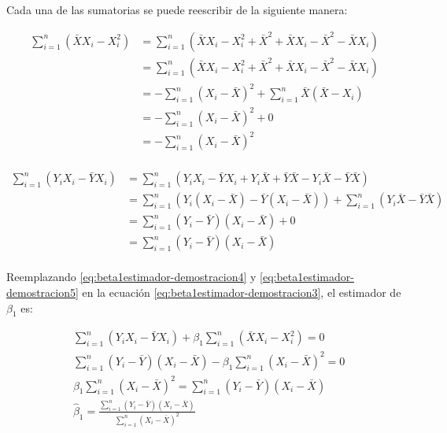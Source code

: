 \documentclass[
  11pt,
]{book}
\theoremstyle{definition}
\theoremstyle{definition}
\theoremstyle{definition}
\theoremstyle{definition}
\theoremstyle{remark}
\begin{document}
Cada una de las sumatorias se puede reescribir de la siguiente manera:

\begin{equation}
\begin{split}
\sum_{i=1}^n(\bar{X}X_i - X_i^2) &= \sum_{i=1}^n(\bar{X}X_i - X_i^2 + \bar{X}^2 + \bar{X}X_i - \bar{X}^2 - \bar{X}X_i)\\
&= \sum_{i=1}^n(\bar{X}X_i - X_i^2 + \bar{X}^2 + \bar{X}X_i - \bar{X}^2 - \bar{X}X_i)\\
&= -\sum_{i=1}^n(X_i -\bar{X})^2 + \sum_{i=1}^n\bar{X}(\bar{X}-X_i)\\
&= -\sum_{i=1}^n(X_i -\bar{X})^2 + 0\\
&= -\sum_{i=1}^n(X_i -\bar{X})^2\\
\end{split}
\label{eq:beta1estimador-demostracion4}
\end{equation}

\begin{equation}
\begin{split}
\sum_{i=1}^n (Y_iX_i - \bar{Y}X_i) &= \sum_{i=1}^n (Y_iX_i - \bar{Y}X_i + Y_i\bar{X} + \bar{Y}\bar{X} - Y_i\bar{X} - \bar{Y}\bar{X})\\
&= \sum_{i=1}^n (Y_i(X_i - \bar{X}) - \bar{Y}(X_i - \bar{X})) + \sum_{i=1}^n(Y_i\bar{X} - \bar{Y}\bar{X}) \\
&= \sum_{i=1}^n (Y_i - \bar{Y})(X_i - \bar{X}) + 0 \\
&= \sum_{i=1}^n (Y_i - \bar{Y})(X_i - \bar{X})\\
\end{split}
\label{eq:beta1estimador-demostracion5}
\end{equation}

Reemplazando \eqref{eq:beta1estimador-demostracion4} y \eqref{eq:beta1estimador-demostracion5} en la ecuación \eqref{eq:beta1estimador-demostracion3}, el estimador de \(\beta_1\) es:

\begin{equation}
\begin{split}
&\sum_{i=1}^n (Y_iX_i - \bar{Y}X_i) + \beta_1\sum_{i=1}^n(\bar{X}X_i - X_i^2) = 0 \\
&\sum_{i=1}^n (Y_i - \bar{Y})(X_i - \bar{X}) - \beta_1\sum_{i=1}^n(X_i -\bar{X})^2 = 0 \\
&\beta_1\sum_{i=1}^n(X_i -\bar{X})^2 = \sum_{i=1}^n (Y_i - \bar{Y})(X_i - \bar{X}) \\
&\widehat{\beta}_1 = \frac{\displaystyle\sum_{i=1}^n (Y_i - \bar{Y})(X_i - \bar{X})}{\displaystyle\sum_{i=1}^n(X_i -\bar{X})^2} \\
\end{split}
\label{eq:beta1estimador-demostracion6}
\end{equation}
\end{document}
